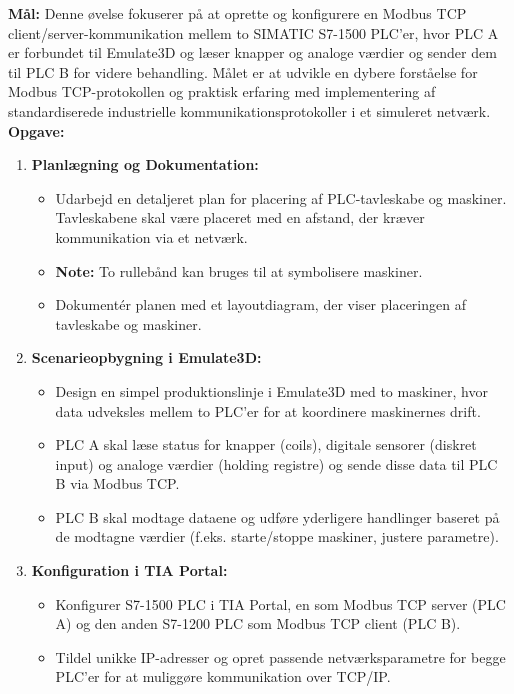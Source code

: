 \textbf{Mål:} Denne øvelse fokuserer på at oprette og konfigurere en Modbus TCP client/server-kommunikation mellem to SIMATIC S7-1500 PLC'er, hvor PLC A er forbundet til Emulate3D og læser knapper og analoge værdier og sender dem til PLC B for videre behandling. Målet er at udvikle en dybere forståelse for Modbus TCP-protokollen og praktisk erfaring med implementering af standardiserede industrielle kommunikationsprotokoller i et simuleret netværk.
\newline\newline
\noindent\textbf{Opgave:}
\begin{enumerate}
	\item \textbf{Planlægning og Dokumentation:}
	\begin{itemize}
		\item Udarbejd en detaljeret plan for placering af PLC-tavleskabe og maskiner. Tavleskabene skal være placeret med en afstand, der kræver kommunikation via et netværk.
		\item \textbf{Note:} To rullebånd kan bruges til at symbolisere maskiner.
		\item Dokumentér planen med et layoutdiagram, der viser placeringen af tavleskabe og maskiner.
	\end{itemize}
	\item \textbf{Scenarieopbygning i Emulate3D:}
	\begin{itemize}
		\item Design en simpel produktionslinje i Emulate3D med to maskiner, hvor data udveksles mellem to PLC'er for at koordinere maskinernes drift.
		\item PLC A skal læse status for knapper (coils), digitale sensorer (diskret input) og analoge værdier (holding registre) og sende disse data til PLC B via Modbus TCP.
		\item PLC B skal modtage dataene og udføre yderligere handlinger baseret på de modtagne værdier (f.eks. starte/stoppe maskiner, justere parametre).
	\end{itemize}
	\item \textbf{Konfiguration i TIA Portal:}
	\begin{itemize}
		\item Konfigurer S7-1500 PLC i TIA Portal, en som Modbus TCP server (PLC A) og den anden S7-1200 PLC som Modbus TCP client (PLC B).
		\item Tildel unikke IP-adresser og opret passende netværksparametre for begge PLC'er for at muliggøre kommunikation over TCP/IP.
	\end{itemize}

\end{enumerate}

